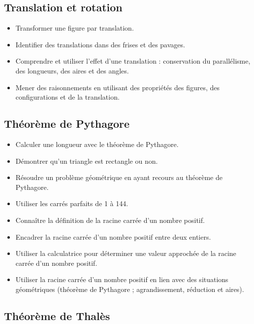 \documentclass[a4paper,12pt,fleqn]{article}	
\begin{document}
\renewcommand{\labelitemi}{}

\subsection*{Translation et rotation}

\begin{itemize}
	\item {}Transformer une figure par translation.
	\item {}Identifier des translations dans des frises et des pavages.
	\item {}Comprendre et utiliser l’effet d’une translation : conservation du parallélisme, des longueurs, des aires et des angles.
	\item {}Mener des raisonnements en utilisant des propriétés des figures, des configurations et de la translation.
\end{itemize}

\subsection*{Théorème de Pythagore}

\begin{itemize}
	\item {}Calculer une longueur avec le théorème de Pythagore.
	\item {}Démontrer qu'un triangle est rectangle ou non.
	\item {}Résoudre un problème géométrique en ayant recours au théorème de Pythagore.
	\item {}Utiliser les carrés parfaits de 1 à 144.
	\item {}Connaître la définition de la racine carrée d’un nombre positif.
	\item {}Encadrer la racine carrée d’un nombre positif entre deux entiers.
	\item {}Utiliser la calculatrice pour déterminer une valeur approchée de la racine carrée d’un nombre positif.
	\item {}Utiliser la racine carrée d’un nombre positif en lien avec des situations géométriques (théorème de Pythagore ; agrandissement, réduction et aires).
\end{itemize}

\subsection*{Théorème de Thalès}
\end{document}
